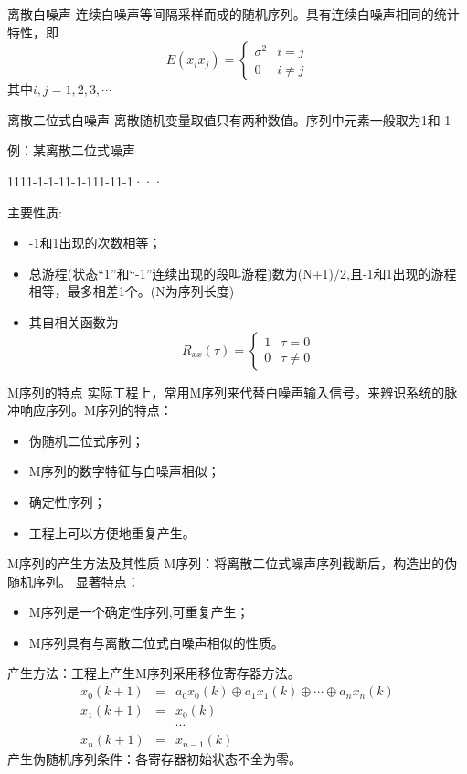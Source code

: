 \begin{frame}{离散白噪声}
连续白噪声等间隔采样而成的随机序列。具有连续白噪声相同的统计特性，即
$$
E(x_i x_j) =\begin{cases} \sigma^2  & i=j \\
0 & i\neq j\end{cases}
$$
其中$i,j=1,2,3,\cdots$
\end{frame}

\begin{frame}{离散二位式白噪声}
离散随机变量取值只有两种数值。序列中元素一般取为1和-1

例：某离散二位式噪声

         1111-1-1-11-1-111-11-1···

主要性质:
\begin{itemize}
\item -1和1出现的次数相等；
\item 总游程(状态“1”和“-1”连续出现的段叫游程)数为(N+1)/2,且-1和1出现的游程相等，最多相差1个。(N为序列长度)
\item 其自相关函数为
$$
R_{xx}(\tau) =\begin{cases} 1  & \tau=0 \\
0 & \tau \neq 0 \end{cases}
$$
\end{itemize}
\end{frame}


\begin{frame}{M序列的特点}
实际工程上，常用M序列来代替白噪声输入信号。来辨识系统的脉冲响应序列。M序列的特点：
\begin{itemize}
\item 伪随机二位式序列；
\item M序列的数字特征与白噪声相似；
\item 确定性序列；
\item 工程上可以方便地重复产生。
\end{itemize}
\end{frame}




\begin{frame}{M序列的产生方法及其性质}
M序列：将离散二位式噪声序列截断后，构造出的伪随机序列。
显著特点：
\begin{itemize}
\item M序列是一个确定性序列,可重复产生；
\item M序列具有与离散二位式白噪声相似的性质。
\end{itemize}
产生方法：工程上产生M序列采用移位寄存器方法。
\begin{eqnarray*}
x_0(k+1)&=&a_0 x_0(k) \oplus a_1 x_1(k)\oplus \cdots \oplus a_n x_n(k) \\
x_1(k+1)&=& x_0(k) \\
&& \cdots \\
x_n(k+1)&=& x_{n-1}(k)
\end{eqnarray*}
产生伪随机序列条件：各寄存器初始状态不全为零。
\end{frame}

